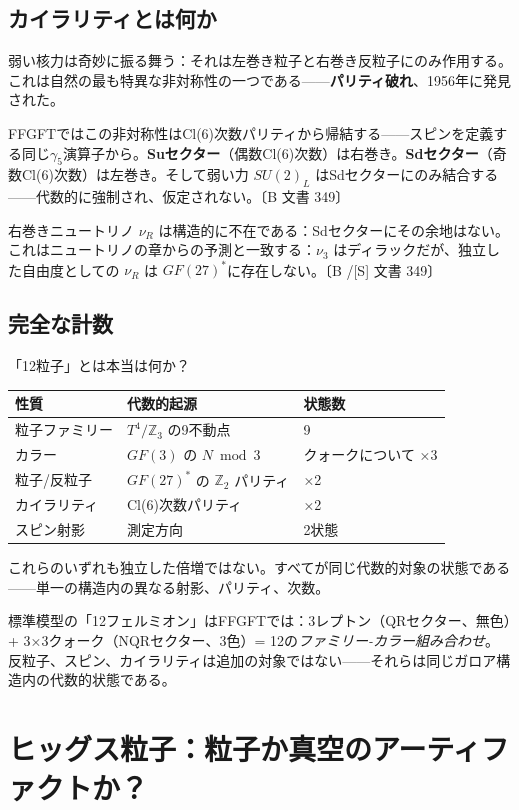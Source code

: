 \documentclass[11pt,openany]{book}
\begin{document}
\section*{カイラリティとは何か}

弱い核力は奇妙に振る舞う：それは左巻き粒子と右巻き反粒子にのみ作用する。これは自然の最も特異な非対称性の一つである——\textbf{パリティ破れ}、1956年に発見された。

FFGFTではこの非対称性はCl(6)次数パリティから帰結する——スピンを定義する同じ$\gamma_5$演算子から。\textbf{Suセクター}（偶数Cl(6)次数）は右巻き。\textbf{Sdセクター}（奇数Cl(6)次数）は左巻き。そして弱い力 $SU(2)_L$ はSdセクターにのみ結合する——代数的に強制され、仮定されない。〔B 文書 349〕

右巻きニュートリノ $\nu_R$ は構造的に不在である：Sdセクターにその余地はない。これはニュートリノの章からの予測と一致する：$\nu_3$ はディラックだが、独立した自由度としての $\nu_R$ は $GF(27)^*$に存在しない。〔B /[S] 文書 349〕

\section*{完全な計数}

「12粒子」とは本当は何か？

\begin{tabular}{lll}
\toprule
性質 & 代数的起源 & 状態数 \\
\midrule
粒子ファミリー & $T^4/\mathbb{Z}_3$ の9不動点 & 9 \\
カラー & $GF(3)$ の $N \bmod 3$ & クォークについて ×3 \\
粒子/反粒子 & $GF(27)^*$ の $\mathbb{Z}_2$ パリティ & ×2 \\
カイラリティ & Cl(6)次数パリティ & ×2 \\
スピン射影 & 測定方向 & 2状態 \\
\bottomrule
\end{tabular}

これらのいずれも独立した倍増ではない。すべてが同じ代数的対象の状態である——単一の構造内の異なる射影、パリティ、次数。

標準模型の「12フェルミオン」はFFGFTでは：3レプトン（QRセクター、無色）+ 3×3クォーク（NQRセクター、3色）= 12の\textit{ファミリー-カラー組み合わせ}。反粒子、スピン、カイラリティは追加の対象ではない——それらは同じガロア構造内の代数的状態である。

\medskip

\chapter{ヒッグス粒子：粒子か真空のアーティファクトか？}
\end{document}
